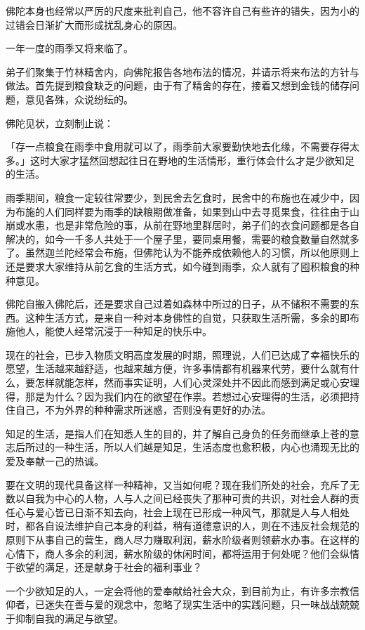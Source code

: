 \documentclass[12pt,twoside,openany]{book}
\begin{document}
佛陀本身也经常以严厉的尺度来批判自己，他不容许自己有些许的错失，因为小的过错会日渐扩大而形成扰乱身心的原因。

一年一度的雨季又将来临了。

弟子们聚集于竹林精舍内，向佛陀报告各地布法的情况，并请示将来布法的方针与做法。首先提到粮食缺乏的问题，由于有了精舍的存在，接着又想到金钱的储存问题，意见各殊，众说纷纭的。

佛陀见状，立刻制止说：

「存一点粮食在雨季中食用就可以了，雨季前大家要勤快地去化缘，不需要存得太多。」这时大家才猛然回想起往日在野地的生活情形，重行体会什么才是少欲知足的生活。

雨季期间，粮食一定较往常要少，到民舍去乞食时，民舍中的布施也在减少中，因为布施的人们同样要为雨季的缺粮期做准备，如果到山中去寻觅果食，往往由于山崩或水患，也是非常危险的事，从前在野地里群居时，弟子们的衣食问题都是各自解决的，如今一千多人共处于一个屋子里，要同桌用餐，需要的粮食数量自然就多了。虽然迦兰陀经常会布施，但佛陀认为不能养成依赖他人的习惯，所以他原则上还是要求大家维持从前乞食的生活方式，如今碰到雨季，众人就有了囤积粮食的种种意见。

佛陀自搬入佛陀后，还是要求自己过着如森林中所过的日子，从不储积不需要的东西。这种生活方式，是来自一种对本身佛性的自觉，只获取生活所需，多余的即布施他人，能使人经常沉浸于一种知足的快乐中。

现在的社会，已步入物质文明高度发展的时期，照理说，人们已达成了幸福快乐的愿望，生活越来越舒适，也越来越方便，许多事情都有机器来代劳，要什么就有什么，要怎样就能怎样，然而事实证明，人们心灵深处并不因此而感到满足或心安理得，那是为什么？因为我们内在的欲望在作祟。若想过心安理得的生活，必须把持住自己，不为外界的种种需求所迷惑，否则没有更好的办法。

知足的生活，是指人们在知悉人生的目的，并了解自己身负的任务而继承上苍的意志后所过的一种生活，所以人们越是知足，生活态度也愈积极，内心也涌现无比的爱及奉献一己的热诚。

要在文明的现代具备这样一种精神，又当如何呢？现在我们所处的社会，充斥了无数以自我为中心的人物，人与人之间已经丧失了那种可贵的共识，对社会人群的责任心与爱心皆已日渐不知去向，社会上现在已形成一种风气，那就是人与人相处时，都各自设法维护自己本身的利益，稍有道德意识的人，则在不违反社会规范的原则下从事自己的营生，商人尽力赚取利润，薪水阶级者则领薪水办事。在这样的心情下，商人多余的利润，薪水阶级的休闲时间，都将运用于何处呢？他们会纵情于欲望的满足，还是献身于社会的福利事业？

一个少欲知足的人，一定会将他的爱奉献给社会大众，到目前为止，有许多宗教信仰者，已迷失在善与爱的观念中，忽略了现实生活中的实践问题，只一味战战兢兢于抑制自我的满足与欲望。
\end{document}
